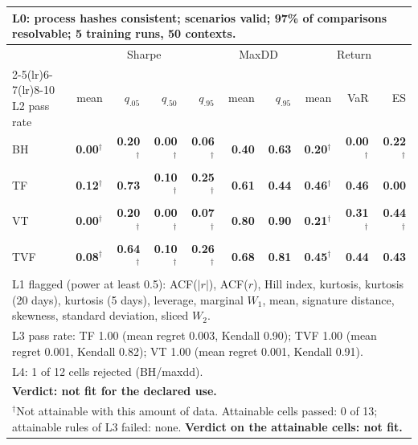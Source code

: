 \begin{tabular}{lrrrrrrrrr}
\toprule
\multicolumn{10}{p{13.5cm}}{L0: process hashes consistent; scenarios valid; 97\% of comparisons resolvable; 5 training runs, 50 contexts.} \\
\midrule
 & \multicolumn{4}{c}{Sharpe} & \multicolumn{2}{c}{MaxDD} & \multicolumn{3}{c}{Return} \\
\cmidrule(lr){2-5}\cmidrule(lr){6-7}\cmidrule(lr){8-10}
L2 pass rate & mean & $q_{.05}$ & $q_{.50}$ & $q_{.95}$ & mean & $q_{.95}$ & mean & VaR & ES \\
\midrule
BH & \textbf{0.00}$^{\dagger}$ & \textbf{0.20}$^{\dagger}$ & \textbf{0.00}$^{\dagger}$ & \textbf{0.06}$^{\dagger}$ & \textbf{0.40} & \textbf{0.63} & \textbf{0.20}$^{\dagger}$ & \textbf{0.00}$^{\dagger}$ & \textbf{0.22}$^{\dagger}$ \\
TF & \textbf{0.12}$^{\dagger}$ & \textbf{0.73} & \textbf{0.10}$^{\dagger}$ & \textbf{0.25}$^{\dagger}$ & \textbf{0.61} & \textbf{0.44} & \textbf{0.46}$^{\dagger}$ & \textbf{0.46} & \textbf{0.00} \\
VT & \textbf{0.00}$^{\dagger}$ & \textbf{0.20}$^{\dagger}$ & \textbf{0.00}$^{\dagger}$ & \textbf{0.07}$^{\dagger}$ & \textbf{0.80} & \textbf{0.90} & \textbf{0.21}$^{\dagger}$ & \textbf{0.31}$^{\dagger}$ & \textbf{0.44}$^{\dagger}$ \\
TVF & \textbf{0.08}$^{\dagger}$ & \textbf{0.64}$^{\dagger}$ & \textbf{0.10}$^{\dagger}$ & \textbf{0.26}$^{\dagger}$ & \textbf{0.68} & \textbf{0.81} & \textbf{0.45}$^{\dagger}$ & \textbf{0.44} & \textbf{0.43} \\
\midrule
\multicolumn{10}{p{13.5cm}}{L1 flagged (power at least 0.5): ACF($|r|$), ACF($r$), Hill index, kurtosis, kurtosis (20 days), kurtosis (5 days), leverage, marginal $W_1$, mean, signature distance, skewness, standard deviation, sliced $W_2$.} \\
\multicolumn{10}{p{13.5cm}}{L3 pass rate: TF 1.00 (mean regret 0.003, Kendall 0.90); TVF 1.00 (mean regret 0.001, Kendall 0.82); VT 1.00 (mean regret 0.001, Kendall 0.91).} \\
\multicolumn{10}{p{13.5cm}}{L4: 1 of 12 cells rejected (BH/maxdd).} \\
\multicolumn{10}{p{13.5cm}}{\textbf{Verdict: not fit for the declared use.}} \\
\multicolumn{10}{p{13.5cm}}{$^{\dagger}$Not attainable with this amount of data. Attainable cells passed: 0 of 13; attainable rules of L3 failed: none. \textbf{Verdict on the attainable cells: not fit.}} \\
\bottomrule
\end{tabular}

